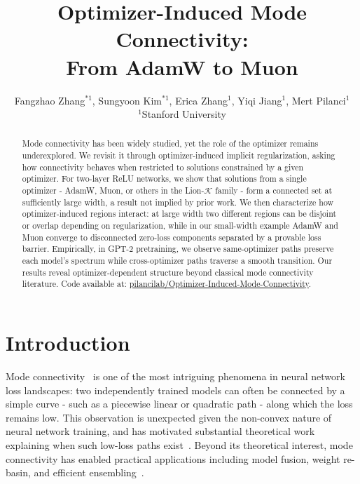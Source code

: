 \documentclass{article}
\title{Optimizer-Induced Mode Connectivity: \\From AdamW to Muon}
\author{%
    Fangzhao Zhang$^{*1}$, 
    Sungyoon Kim$^{*1}$, 
    Erica Zhang$^{1}$, 
    Yiqi Jiang$^{1}$, 
    Mert Pilanci$^{1}$ \\[6pt]
    $^{1}$Stanford University 
}
\begin{document}
\maketitle
\renewcommand{\thefootnote}{}
\renewcommand{\thefootnote}{\arabic{footnote}}


\begin{abstract} 
Mode connectivity has been widely studied, yet the role of the optimizer remains underexplored. We revisit it through optimizer-induced implicit regularization, asking how connectivity behaves when restricted to solutions constrained by a given optimizer. For two-layer ReLU networks, we show that solutions from a single optimizer - AdamW, Muon, or others in the Lion-$\mathcal{K}$ family - form a connected set at sufficiently large width, a result not implied by prior work. We then characterize how optimizer-induced regions interact: at large width two different regions can be disjoint or overlap depending on regularization, while in our small-width example AdamW and Muon converge to disconnected zero-loss components separated by a provable loss barrier. Empirically, in GPT-2 pretraining, we observe same-optimizer paths preserve each model's spectrum while cross-optimizer paths traverse a smooth transition. Our results reveal optimizer-dependent structure beyond classical mode connectivity literature. Code available at: \href{https://github.com/pilancilab/Optimizer-Induced-Mode-Connectivity}{pilancilab/Optimizer-Induced-Mode-Connectivity}.
\end{abstract}

 
\section{Introduction}
\label{sec:intro}

Mode connectivity~\citep{garipov2018losssurfacesmodeconnectivity} is one of the most intriguing phenomena in neural network loss landscapes: two independently trained models can often be connected by a simple curve - such as a piecewise linear or quadratic path - along which the loss remains low. This observation is unexpected given the non-convex nature of neural network training, and has motivated substantial theoretical work explaining when such low-loss paths exist~\citep{freeman2017topologygeometryhalfrectifiednetwork,kuditipudi2020explaininglandscapeconnectivitylowcost,nguyen2021note,nguyen2021solutions,kim2024exploring,ferbach2024provinglinearmodeconnectivity,zhan2025analyzing}. Beyond its theoretical interest, mode connectivity has enabled practical applications including model fusion, weight re-basin, and efficient ensembling~\citep{pena2022rebasinimplicitsinkhorndifferentiation,liu2022deep,akash2022wassersteinbarycenterbasedmodelfusion,ainsworth2023gitrebasinmergingmodels,jordan2023repairrenormalizingpermutedactivations,singh2023modelfusionoptimaltransport}.
\end{document}
